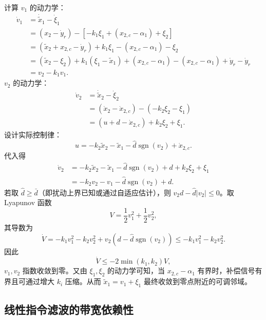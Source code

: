 \documentclass[UTF8,a4paper,11pt]{ctexart}
\begin{document}
计算 $v_1$ 的动力学：
\begin{align}
\dot{v}_1 &= \dot{\tilde{x}}_1 - \dot{\xi}_1 \\
&= (x_2 - \dot{y}_r) - [-k_1\xi_1 + (x_{2,c} - \alpha_1) + \xi_2] \\
&= (\tilde{x}_2 + x_{2,c} - \dot{y}_r) + k_1\xi_1 - (x_{2,c} - \alpha_1) - \xi_2 \\
&= (\tilde{x}_2 - \xi_2) + k_1(\xi_1 - \tilde{x}_1) + (x_{2,c} - \alpha_1) - (x_{2,c} - \alpha_1) + \dot{y}_r - \dot{y}_r \\
&= v_2 - k_1 v_1.
\end{align}
$v_2$ 的动力学：
\begin{align}
\dot{v}_2 &= \dot{\tilde{x}}_2 - \dot{\xi}_2 \\
&= (\dot{x}_2 - \dot{x}_{2,c}) - (-k_2\xi_2 - \xi_1) \\
&= (u + d - \dot{x}_{2,c}) + k_2\xi_2 + \xi_1.
\end{align}
设计实际控制律：
\begin{equation}
u = -k_2\tilde{x}_2 - \tilde{x}_1 - \hat{d}\operatorname{sgn}(v_2) + \dot{x}_{2,c}.
\end{equation}
代入得
\begin{align}
\dot{v}_2 &= -k_2\tilde{x}_2 - \tilde{x}_1 - \hat{d}\operatorname{sgn}(v_2) + d + k_2\xi_2 + \xi_1 \\
&= -k_2 v_2 - v_1 - \hat{d}\operatorname{sgn}(v_2) + d.
\end{align}
若取 $\hat{d} \geq \bar{d}$（即扰动上界已知或通过自适应估计），则 $v_2 d - \hat{d}|v_2| \leq 0$。取 Lyapunov 函数
\begin{equation}
V = \frac12 v_1^2 + \frac12 v_2^2,
\end{equation}
其导数为
\begin{equation}
\dot{V} = -k_1 v_1^2 - k_2 v_2^2 + v_2(d - \hat{d}\operatorname{sgn}(v_2)) \leq -k_1 v_1^2 - k_2 v_2^2.
\end{equation}
因此
\begin{equation}
\dot{V} \leq -2\min(k_1,k_2) V,
\end{equation}
$v_1, v_2$ 指数收敛到零。又由 $\xi_1, \xi_2$ 的动力学可知，当 $x_{2,c} - \alpha_1$ 有界时，补偿信号有界且可通过增大 $k_i$ 压缩。从而 $\tilde{x}_1 = v_1 + \xi_1$ 最终收敛到零点附近的可调邻域。

\subsection{线性指令滤波的带宽依赖性}
\end{document}

